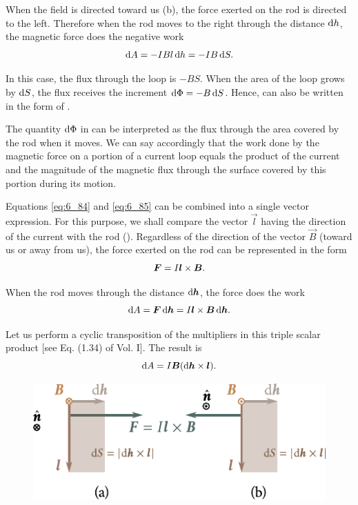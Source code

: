 \noindent
When the field is directed toward us (b), the force exerted on the rod is directed to the left. Therefore when the rod moves to the right through the distance $\mathrm{d} h$, the magnetic force does the negative work
\begin{equation}\label{eq:6_86}
    \mathrm{d} A = - I B l\, \mathrm{d} h = - I B\, \mathrm{d} S.
\end{equation}

\noindent
In this case, the flux through the loop is $-BS$. When the area of the loop grows by $\mathrm{d} S$, the flux receives the increment $\mathrm{d}\Phi=-B\,\mathrm{d} S$. Hence,  can also be written in the form of .

The quantity $\mathrm{d}\Phi$ in  can be interpreted as the flux through the area covered by the rod when it moves. We can say accordingly that the work done by the magnetic force on a portion of a current loop equals the product of the current and the magnitude of the magnetic flux through the surface covered by this portion during its motion.

Equations \eqref{eq:6_84} and \eqref{eq:6_85} can be combined into a single vector expression. For this purpose, we shall compare the vector $\vec{l}$ having the direction of the current with the rod (). Regardless of the direction of the vector $\vec{B}$ (toward us or away from us), the force exerted on the rod can be represented in the form
\begin{equation*}
    \boldsymbol{F} = I \boldsymbol{l}\times\boldsymbol{B}.
\end{equation*}

\noindent
When the rod moves through the distance $\mathrm{d}\boldsymbol{h}$, the force does the work
\begin{equation*}
    \mathrm{d} A = \boldsymbol{F}\, \mathrm{d}\boldsymbol{h} = I \boldsymbol{l}\times\boldsymbol{B}\, \mathrm{d}\boldsymbol{h}.
\end{equation*}

\noindent
Let us perform a cyclic transposition of the multipliers in this triple scalar product [see Eq. (1.34) of Vol. I]. The result is
\begin{equation}\label{eq:6_87}
    \mathrm{d} A = I \boldsymbol{B} (\mathrm{d}\boldsymbol{h} \times \boldsymbol{l}).
\end{equation}

\begin{figure}[t]
	\begin{center}
		\includegraphics[scale=1.1]{figures/ch_06/fig_6_22.pdf}
		\caption[]{}
		\label{fig:6_22}
	\end{center}
	\vspace{-0.8cm}
\end{figure}

